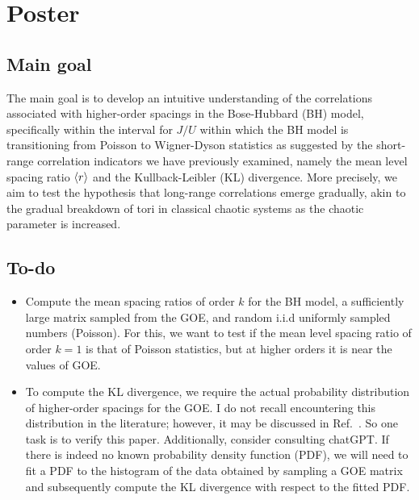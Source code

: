 
\section{Poster}
\subsection{Main goal}
The main goal is to develop an intuitive understanding of the 
correlations associated with higher-order spacings in the Bose-Hubbard (BH) 
model, specifically within the interval for $J/U$ within which the BH model 
is transitioning from Poisson to Wigner-Dyson 
statistics as suggested by the short-range 
correlation indicators we have previously examined, namely the mean level 
spacing ratio $\ev{r}$ and the Kullback-Leibler (KL) divergence. 
More precisely, we aim to test the hypothesis that long-range correlations emerge gradually, akin to the gradual breakdown of tori in classical chaotic systems as the chaotic parameter is increased.

\subsection{To-do}
\begin{itemize}
\item Compute the mean spacing ratios of order $k$ for the BH model, 
a sufficiently large matrix sampled from the GOE, and random i.i.d 
uniformly sampled numbers (Poisson). For this, we want to test if the 
mean level spacing ratio of order $k=1$ is that of Poisson statistics, but
at higher orders it is near the values of GOE.

\item To compute the KL divergence, we require the actual probability 
distribution of higher-order spacings for the GOE. I do not recall 
encountering this distribution in the literature; however, it may be 
discussed in Ref.~\cite{rout_2025_higherorder}. So one task is to verify 
this paper. Additionally, consider consulting chatGPT. If there 
is indeed no known probability density function (PDF), we will need to 
fit a PDF to the histogram of the data obtained by sampling a GOE matrix 
and subsequently compute the KL 
divergence with respect to the fitted PDF.
\end{itemize} 

%
